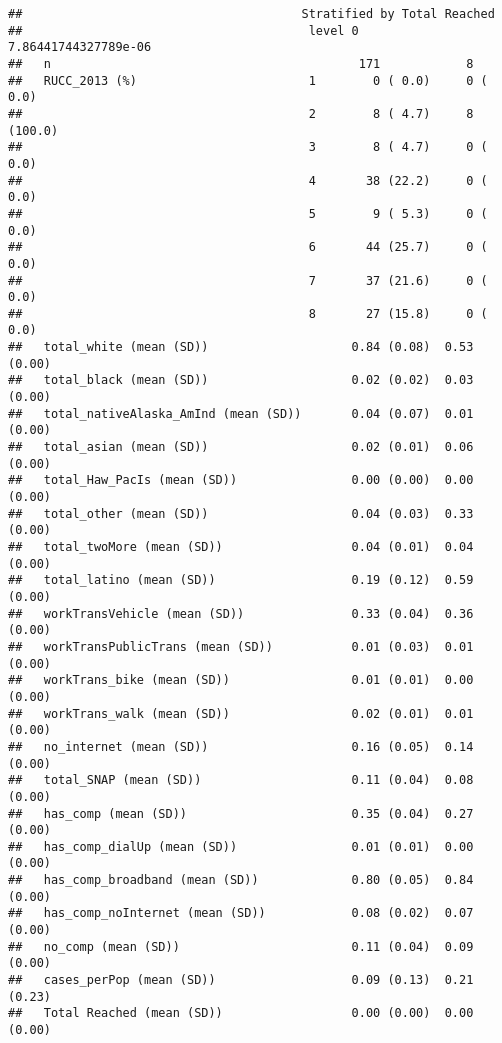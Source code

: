 \documentclass[
]{article}
\begin{document}
\begin{verbatim}
##                                       Stratified by Total Reached
##                                        level 0            7.86441744327789e-06
##   n                                           171            8                
##   RUCC_2013 (%)                        1        0 ( 0.0)     0 (  0.0)        
##                                        2        8 ( 4.7)     8 (100.0)        
##                                        3        8 ( 4.7)     0 (  0.0)        
##                                        4       38 (22.2)     0 (  0.0)        
##                                        5        9 ( 5.3)     0 (  0.0)        
##                                        6       44 (25.7)     0 (  0.0)        
##                                        7       37 (21.6)     0 (  0.0)        
##                                        8       27 (15.8)     0 (  0.0)        
##   total_white (mean (SD))                    0.84 (0.08)  0.53 (0.00)         
##   total_black (mean (SD))                    0.02 (0.02)  0.03 (0.00)         
##   total_nativeAlaska_AmInd (mean (SD))       0.04 (0.07)  0.01 (0.00)         
##   total_asian (mean (SD))                    0.02 (0.01)  0.06 (0.00)         
##   total_Haw_PacIs (mean (SD))                0.00 (0.00)  0.00 (0.00)         
##   total_other (mean (SD))                    0.04 (0.03)  0.33 (0.00)         
##   total_twoMore (mean (SD))                  0.04 (0.01)  0.04 (0.00)         
##   total_latino (mean (SD))                   0.19 (0.12)  0.59 (0.00)         
##   workTransVehicle (mean (SD))               0.33 (0.04)  0.36 (0.00)         
##   workTransPublicTrans (mean (SD))           0.01 (0.03)  0.01 (0.00)         
##   workTrans_bike (mean (SD))                 0.01 (0.01)  0.00 (0.00)         
##   workTrans_walk (mean (SD))                 0.02 (0.01)  0.01 (0.00)         
##   no_internet (mean (SD))                    0.16 (0.05)  0.14 (0.00)         
##   total_SNAP (mean (SD))                     0.11 (0.04)  0.08 (0.00)         
##   has_comp (mean (SD))                       0.35 (0.04)  0.27 (0.00)         
##   has_comp_dialUp (mean (SD))                0.01 (0.01)  0.00 (0.00)         
##   has_comp_broadband (mean (SD))             0.80 (0.05)  0.84 (0.00)         
##   has_comp_noInternet (mean (SD))            0.08 (0.02)  0.07 (0.00)         
##   no_comp (mean (SD))                        0.11 (0.04)  0.09 (0.00)         
##   cases_perPop (mean (SD))                   0.09 (0.13)  0.21 (0.23)         
##   Total Reached (mean (SD))                  0.00 (0.00)  0.00 (0.00)         

\end{verbatim}
\end{document}
